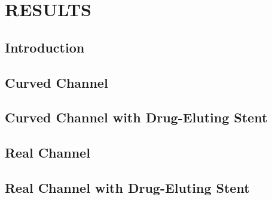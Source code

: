 \chapter{\textbf{RESULTS}}
\label{resultados}

\section{\textbf{Introduction}} 


\section{\textbf{Curved Channel}} 
\label{canal curvado}



\section{\textbf{Curved Channel with Drug-Eluting Stent}} 
\label{canal curvado com stent}



\section{\textbf{Real Channel}} 
\label{canal real}



\section{\textbf{Real Channel with Drug-Eluting Stent}} 
\label{canal real com stent}



